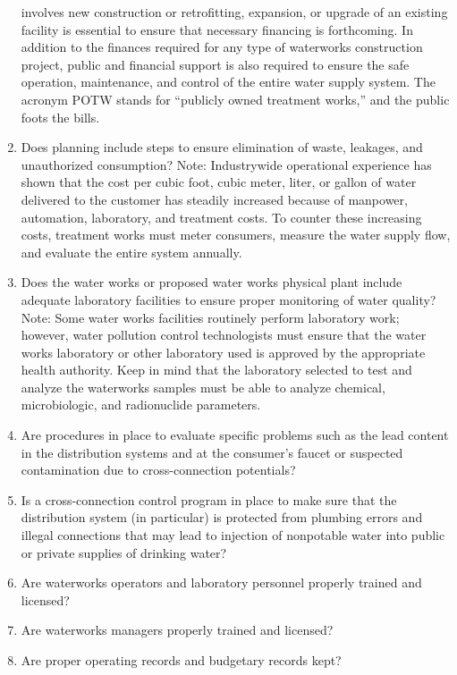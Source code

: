 \documentclass{article}
\begin{document}
\begin{enumerate}
  involves new construction or retrofitting, expansion, or upgrade of an
  existing facility is essential to ensure that necessary financing is
  forthcoming. In addition to the finances required for any type of
  waterworks construction project, public and financial support is also
  required to ensure the safe operation, maintenance, and control of the
  entire water supply system. The acronym POTW stands for ``publicly
  owned treatment works,'' and the public foots the bills.
\item
  Does planning include steps to ensure elimination of waste, leakages,
  and unauthorized consumption? Note: Industrywide operational
  experience has shown that the cost per cubic foot, cubic meter, liter,
  or gallon of water delivered to the customer has steadily increased
  because of manpower, automation, laboratory, and treatment costs. To
  counter these increasing costs, treatment works must meter consumers,
  measure the water supply flow, and evaluate the entire system
  annually.
\item
  Does the water works or proposed water works physical plant include
  adequate laboratory facilities to ensure proper monitoring of water
  quality? Note: Some water works facilities routinely perform
  laboratory work; however, water pollution control technologists must
  ensure that the water works laboratory or other laboratory used is
  approved by the appropriate health authority. Keep in mind that the
  laboratory selected to test and analyze the waterworks samples must be
  able to analyze chemical, microbiologic, and radionuclide parameters.
\item
  Are procedures in place to evaluate specific problems such as the lead
  content in the distribution systems and at the consumer's faucet or
  suspected contamination due to cross-connection potentials?
\item
  Is a cross-connection control program in place to make sure that the
  distribution system (in particular) is protected from plumbing errors
  and illegal connections that may lead to injection of nonpotable water
  into public or private supplies of drinking water?
\item
  Are waterworks operators and laboratory personnel properly trained and
  licensed?
\item
  Are waterworks managers properly trained and licensed?
\item
  Are proper operating records and budgetary records kept?
\end{enumerate}
\end{document}

